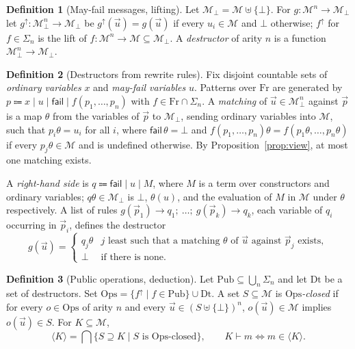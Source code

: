 \documentclass[11pt]{article}
\theoremstyle{definition}
\newtheorem{definition}{Definition}[section]
\theoremstyle{plain}
\theoremstyle{remark}
\newcommand{\Msg}{\mathcal{M}}
\newcommand{\Msgf}{\Msg_{\bot}}
\newcommand{\Fr}{\mathrm{Fr}}
\newcommand{\Ops}{\mathrm{Ops}}
\newcommand{\Pub}{\mathrm{Pub}}
\newcommand{\Dt}{\mathrm{Dt}}
\newcommand{\pv}[1]{\mathsf{#1}}
\newcommand{\fail}{\pv{fail}}
\begin{document}
\begin{definition}[May-fail messages, lifting]
Let $\Msgf=\Msg\uplus\{\bot\}$. For $g:\Msg^n\to\Msgf$ let $g^{\uparrow}:\Msgf^n\to\Msgf$ be $g^{\uparrow}(\vec u)=g(\vec u)$ if every $u_i\in\Msg$ and $\bot$ otherwise; $f^{\uparrow}$ for $f\in\Sigma_n$ is the lift of $f:\Msg^n\to\Msg\subseteq\Msgf$. A \emph{destructor} of arity $n$ is a function $\Msgf^n\to\Msgf$.
\end{definition}

\begin{definition}[Destructors from rewrite rules]\label{def:rules}
Fix disjoint countable sets of \emph{ordinary variables} $x$ and \emph{may-fail variables} $u$. Patterns over $\Fr$ are generated by $p\Coloneqq x\mid u\mid\fail\mid f(p_1,\dots,p_n)$ with $f\in\Fr\cap\Sigma_n$. A \emph{matching} of $\vec u\in\Msgf^n$ against $\vec p$ is a map $\theta$ from the variables of $\vec p$ to $\Msgf$, sending ordinary variables into $\Msg$, such that $p_i\theta=u_i$ for all $i$, where $\fail\,\theta=\bot$ and $f(p_1,\dots,p_n)\theta=f(p_1\theta,\dots,p_n\theta)$ if every $p_j\theta\in\Msg$ and is undefined otherwise. By Proposition~\ref{prop:view}, at most one matching exists.

A \emph{right-hand side} is $q\Coloneqq\fail\mid u\mid M$, where $M$ is a term over constructors and ordinary variables; $q\theta\in\Msgf$ is $\bot$, $\theta(u)$, and the evaluation of $M$ in $\Msg$ under $\theta$ respectively. A list of rules $g(\vec p_1)\to q_1;\ \dots;\ g(\vec p_k)\to q_k$, each variable of $q_i$ occurring in $\vec p_i$, defines the destructor
\[
g(\vec u)=\begin{cases}
q_j\theta & j \text{ least such that a matching } \theta \text{ of } \vec u \text{ against } \vec p_j \text{ exists},\\
\bot & \text{if there is none.}
\end{cases}
\]
\end{definition}

\begin{definition}[Public operations, deduction]
Let $\Pub\subseteq\bigcup_n\Sigma_n$ and let $\Dt$ be a set of destructors. Set $\Ops=\{f^{\uparrow}\mid f\in\Pub\}\cup\Dt$. A set $S\subseteq\Msg$ is \emph{$\Ops$-closed} if for every $o\in\Ops$ of arity $n$ and every $\vec u\in(S\uplus\{\bot\})^n$, $o(\vec u)\in\Msg$ implies $o(\vec u)\in S$. For $K\subseteq\Msg$,
\[
\langle K\rangle=\bigcap\{S\supseteq K\mid S\text{ is $\Ops$-closed}\},
\qquad
K\vdash m\iff m\in\langle K\rangle .
\]
\end{definition}
\end{document}
